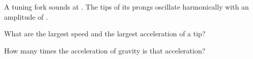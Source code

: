 A tuning fork sounds at \fO. The tips of its prongs oscillate harmonically with an amplitude of \AO.

\begin{abcliste}
\abc
What are the largest speed and the largest acceleration of a tip?

\abc
How many times the acceleration of gravity is that acceleration?
\end{abcliste}
